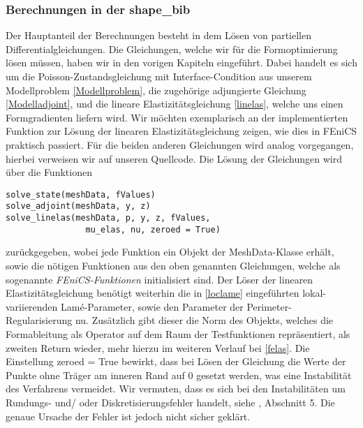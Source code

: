 \subsubsection{Berechnungen in der shape\_bib}\label{Berechnung_bib}
 Der Hauptanteil der Berechnungen besteht in dem Lösen von partiellen Differentialgleichungen. Die Gleichungen, welche wir für die Formoptimierung lösen müssen, haben wir in den vorigen Kapiteln eingeführt. Dabei handelt es sich um die Poisson-Zustandsgleichung mit Interface-Condition aus unserem Modellproblem \ref{Modellproblem}, die zugehörige adjungierte Gleichung \ref{Modelladjoint}, und die lineare Elastizitätsgleichung \ref{linelas}, welche uns einen Formgradienten liefern wird. Wir möchten exemplarisch an der implementierten Funktion zur Lösung der linearen Elastizitätsgleichung zeigen, wie dies in FEniCS praktisch passiert. Für die beiden anderen Gleichungen wird analog vorgegangen, hierbei verweisen wir auf unseren Quellcode. Die Lösung der Gleichungen wird über die Funktionen 
\begin{lstlisting}
solve_state(meshData, fValues)
solve_adjoint(meshData, y, z)
solve_linelas(meshData, p, y, z, fValues, 
	            mu_elas, nu, zeroed = True)
\end{lstlisting}
zurückgegeben, wobei jede Funktion ein Objekt der \textsf{MeshData}-Klasse erhält, sowie die nötigen Funktionen aus den oben genannten Gleichungen, welche als sogenannte \textit{FEniCS-Funktionen} initialisiert sind. Der Löser der linearen Elastizitätsgleichung benötigt weiterhin die in \ref{loclame} eingeführten lokal-variierenden Lamé-Parameter, sowie den Parameter der Perimeter-Regularisierung \textsf{nu}. Zusätzlich gibt dieser die Norm des Objekts, welches die Formableitung als Operator auf dem Raum der Testfunktionen repräsentiert, als zweiten Return wieder, mehr hierzu im weiteren Verlauf bei \ref{felas}. Die Einstellung \textsf{zeroed = True} bewirkt, dass bei Lösen der Gleichung die Werte der Punkte ohne Träger am inneren Rand auf 0 gesetzt werden, was eine Instabilität des Verfahrens vermeidet. Wir vermuten, dass es sich bei den Instabilitäten um Rundungs- und/ oder Diskretisierungsfehler handelt, siehe \cite{bfgs2}, Abschnitt 5. Die genaue Ursache der Fehler ist jedoch nicht sicher geklärt. 

